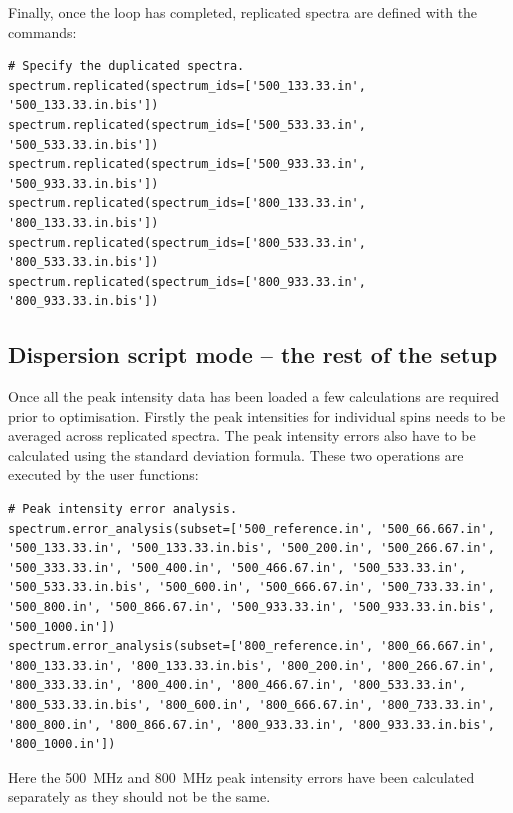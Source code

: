 Finally, once the  loop has completed, replicated spectra are defined with the commands:

\begin{lstlisting}[firstnumber=101]
# Specify the duplicated spectra.
spectrum.replicated(spectrum_ids=['500_133.33.in', '500_133.33.in.bis'])
spectrum.replicated(spectrum_ids=['500_533.33.in', '500_533.33.in.bis'])
spectrum.replicated(spectrum_ids=['500_933.33.in', '500_933.33.in.bis'])
spectrum.replicated(spectrum_ids=['800_133.33.in', '800_133.33.in.bis'])
spectrum.replicated(spectrum_ids=['800_533.33.in', '800_533.33.in.bis'])
spectrum.replicated(spectrum_ids=['800_933.33.in', '800_933.33.in.bis'])
\end{lstlisting}



\subsection{Dispersion script mode -- the rest of the setup} \label{sect: dispersion setup fin}

Once all the peak intensity data has been loaded a few calculations are required prior to optimisation.  Firstly the peak intensities for individual spins needs to be averaged across replicated spectra.  The peak intensity errors also have to be calculated using the standard deviation formula.  These two operations are executed by the user functions:

\begin{lstlisting}[firstnumber=109]
# Peak intensity error analysis.
spectrum.error_analysis(subset=['500_reference.in', '500_66.667.in', '500_133.33.in', '500_133.33.in.bis', '500_200.in', '500_266.67.in', '500_333.33.in', '500_400.in', '500_466.67.in', '500_533.33.in', '500_533.33.in.bis', '500_600.in', '500_666.67.in', '500_733.33.in', '500_800.in', '500_866.67.in', '500_933.33.in', '500_933.33.in.bis', '500_1000.in'])
spectrum.error_analysis(subset=['800_reference.in', '800_66.667.in', '800_133.33.in', '800_133.33.in.bis', '800_200.in', '800_266.67.in', '800_333.33.in', '800_400.in', '800_466.67.in', '800_533.33.in', '800_533.33.in.bis', '800_600.in', '800_666.67.in', '800_733.33.in', '800_800.in', '800_866.67.in', '800_933.33.in', '800_933.33.in.bis', '800_1000.in'])
\end{lstlisting}

Here the 500~MHz and 800~MHz peak intensity errors have been calculated separately as they should not be the same.

